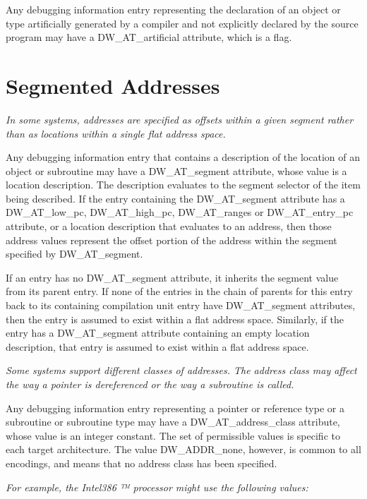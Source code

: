 Any debugging information entry representing the
declaration of an object or type artificially generated by
a compiler and not explicitly declared by the source program
may have a DW\_AT\_artificial attribute, which is a flag.

\section{Segmented Addresses}
\label{chap:segmentedaddresses}
\textit{In some systems, addresses are specified as offsets within a
given segment rather than as locations within a single flat
address space.}

Any debugging information entry that contains a description
of the location of an object or subroutine may have
a DW\_AT\_segment attribute, whose value is a location
description. The description evaluates to the segment selector
of the item being described. If the entry containing the
DW\_AT\_segment attribute has a DW\_AT\_low\_pc, DW\_AT\_high\_pc,
DW\_AT\_ranges or DW\_AT\_entry\_pc attribute, or a location
description that evaluates to an address, then those address
values represent the offset portion of the address within
the segment specified by DW\_AT\_segment.

If an entry has no DW\_AT\_segment attribute, it inherits
the segment value from its parent entry.  If none of the
entries in the chain of parents for this entry back to
its containing compilation unit entry have DW\_AT\_segment
attributes, then the entry is assumed to exist within a flat
address space. Similarly, if the entry has a DW\_AT\_segment
attribute containing an empty location description, that
entry is assumed to exist within a flat address space.

\textit{Some systems support different classes of addresses. The
address class may affect the way a pointer is dereferenced
or the way a subroutine is called.}


Any debugging information entry representing a pointer or
reference type or a subroutine or subroutine type may have
a DW\_AT\_address\_class attribute, whose value is an integer
constant.  The set of permissible values is specific to
each target architecture. The value DW\_ADDR\_none, however,
is common to all encodings, and means that no address class
has been specified.

\textit {For example, the Intel386 ™ processor might use the following values:}

